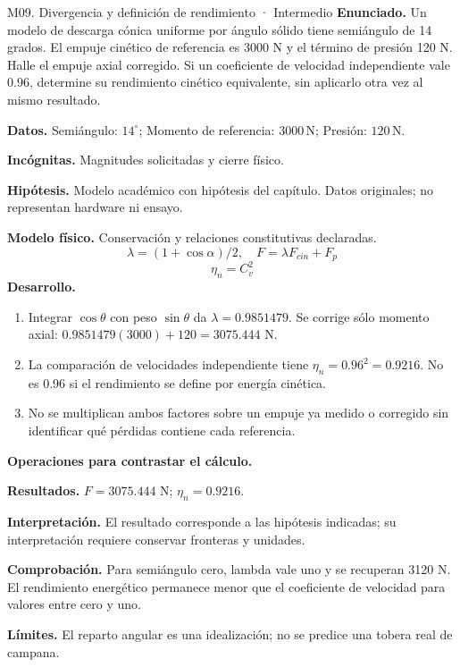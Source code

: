 \begin{studiumworked}{M09. Divergencia y definición de rendimiento · Intermedio}
\textbf{Enunciado.} Un modelo de descarga cónica uniforme por ángulo sólido tiene semiángulo de 14 grados. El empuje cinético de referencia es 3000 N y el término de presión 120 N. Halle el empuje axial corregido. Si un coeficiente de velocidad independiente vale 0.96, determine su rendimiento cinético equivalente, sin aplicarlo otra vez al mismo resultado.

\textbf{Datos.} Semiángulo: $14^\circ$; Momento de referencia: $3000\,\mathrm{N}$; Presión: $120\,\mathrm{N}$.

\textbf{Incógnitas.} Magnitudes solicitadas y cierre físico.

\textbf{Hipótesis.} Modelo académico con hipótesis del capítulo. Datos originales; no representan hardware ni ensayo.

\textbf{Modelo físico.} Conservación y relaciones constitutivas declaradas.
\[\lambda=(1+\cos\alpha)/2,\quad F=\lambda F_{cin}+F_p\]
\[\eta_n=C_v^2\]
\textbf{Desarrollo.}
\begin{enumerate}
\item Integrar $\cos\theta$ con peso $\sin\theta$ da $\lambda=0.9851479$. Se corrige sólo momento axial: $0.9851479(3000)+120=3075.444$ N.
\item La comparación de velocidades independiente tiene $\eta_n=0.96^2=0.9216$. No es 0.96 si el rendimiento se define por energía cinética.
\item No se multiplican ambos factores sobre un empuje ya medido o corregido sin identificar qué pérdidas contiene cada referencia.
\end{enumerate}
\textbf{Operaciones para contrastar el cálculo.}

\textbf{Resultados.} $F=3075.444$ N; $\eta_n=0.9216$.

\textbf{Interpretación.} El resultado corresponde a las hipótesis indicadas; su interpretación requiere conservar fronteras y unidades.

\textbf{Comprobación.} Para semiángulo cero, lambda vale uno y se recuperan 3120 N. El rendimiento energético permanece menor que el coeficiente de velocidad para valores entre cero y uno.

\textbf{Límites.} El reparto angular es una idealización; no se predice una tobera real de campana.
\end{studiumworked}
